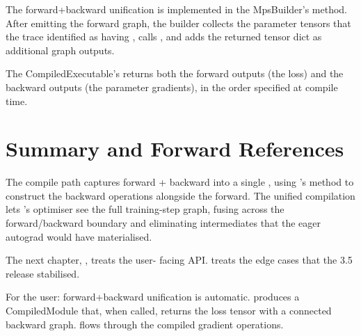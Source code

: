 The forward+backward unification is implemented in the
MpsBuilder's  method. After emitting the forward
graph, the builder collects the parameter tensors that the trace
identified as having , calls
, and adds the
returned tensor dict as additional graph outputs.

The CompiledExecutable's  returns both the forward
outputs (the loss) and the backward outputs (the parameter
gradients), in the order specified at compile time.

\section{Summary and Forward References}
\label{sec:fwd_bwd_compile:summary}

The compile path captures forward + backward into a single
\MPSGraph, using \MPSGraph's
 method to construct
the backward operations alongside the forward. The unified
compilation lets \MPSGraph's optimiser see the full training-step
graph, fusing across the forward/backward boundary and
eliminating intermediates that the eager autograd would have
materialised.

The next chapter, , treats the user-
facing  API. 
treats the edge cases that the 3.5 release stabilised.

\begin{lucidnote}
For the user: forward+backward unification is automatic.
 produces a CompiledModule that, when
called, returns the loss tensor with a connected backward graph.
 flows through the compiled gradient
operations.
\end{lucidnote}
